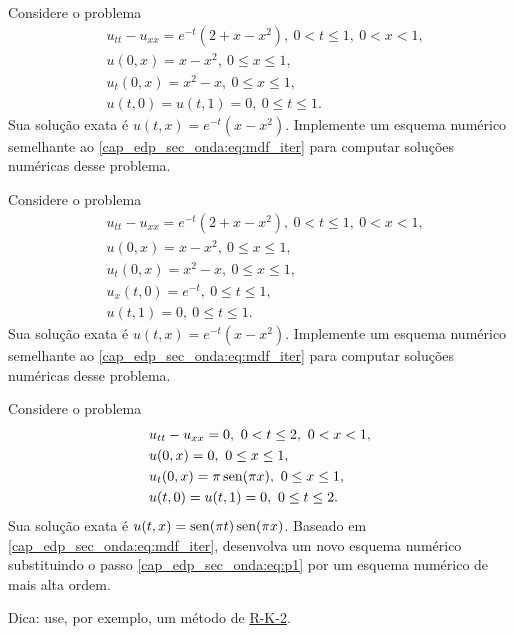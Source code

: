 \begin{exer}
  Considere o problema
  \begin{subequations}
    \begin{align}
      &u_{tt} - u_{xx} = e^{-t}(2+x-x^2), ~0 < t \leq 1, ~0< x < 1,\\
      &u(0,x) = x-x^2, ~0\leq x \leq 1,\\
      &u_t(0,x) = x^2-x, ~0\leq x \leq 1,\\
      &u(t,0) = u(t,1) = 0, ~0\leq t \leq 1.
    \end{align}
  \end{subequations}
  Sua solução exata é $u(t,x) = e^{-t}(x-x^2)$. Implemente um esquema numérico semelhante ao \eqref{cap_edp_sec_onda:eq:mdf_iter} para computar soluções numéricas desse problema.
\end{exer}

\begin{exer}
  Considere o problema
  \begin{subequations}
    \begin{align}
      &u_{tt} - u_{xx} = e^{-t}(2+x-x^2), ~0 < t \leq 1, ~0< x < 1,\\
      &u(0,x) = x-x^2, ~0\leq x \leq 1,\\
      &u_t(0,x) = x^2-x, ~0\leq x \leq 1,\\
      &u_x(t,0) = e^{-t}, ~0\leq t \leq 1,\\
      &u(t,1) = 0, ~0\leq t \leq 1.
    \end{align}
  \end{subequations}
  Sua solução exata é $u(t,x) = e^{-t}(x-x^2)$. Implemente um esquema numérico semelhante ao \eqref{cap_edp_sec_onda:eq:mdf_iter} para computar soluções numéricas desse problema.
\end{exer}

\begin{exer}
  Considere o problema
  \begin{subequations}
    \begin{align}
      &u_{tt} - u_{xx} = 0, ~0 < t \leq 2, ~0< x < 1,\\
      &u(0,x) = 0, ~0\leq x \leq 1,\\
      &u_t(0,x) = \pi\operatorname{sen}(\pi x), ~0\leq x \leq 1,\\
      &u(t,0) = u(t,1) = 0, ~0\leq t \leq 2.
    \end{align}
  \end{subequations}
  Sua solução exata é $u(t,x) = \operatorname{sen}(\pi t)\operatorname{sen}(\pi x)$. Baseado em \eqref{cap_edp_sec_onda:eq:mdf_iter}, desenvolva um novo esquema numérico substituindo o passo \eqref{cap_edp_sec_onda:eq:p1} por um esquema numérico de mais alta ordem.
\end{exer}
\begin{resp}
  Dica: use, por exemplo, um método de \href{https://notaspedrok.com.br/notas/MatematicaNumericaII/cap_pvi_sec_rk.html}{R-K-2}.
\end{resp}

